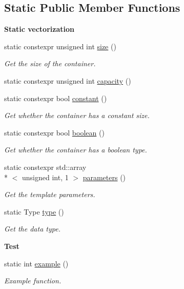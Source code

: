 \subsection*{Static Public Member Functions}
\begin{Indent}{\bf Static vectorization}\par
\begin{DoxyCompactItemize}
\item 
static constexpr unsigned int \hyperlink{exceptionmagrathea_1_1Vectorized_a69853d16152b7ac5d6b74c0a819745a0}{size} ()
\begin{DoxyCompactList}\small\item\em Get the size of the container. \end{DoxyCompactList}\item 
static constexpr unsigned int \hyperlink{exceptionmagrathea_1_1Vectorized_aa169da938d44f5b2b368429d2fcd5944}{capacity} ()
\item 
static constexpr bool \hyperlink{exceptionmagrathea_1_1Vectorized_a41efb27191ba62b4effdccb2394292f5}{constant} ()
\begin{DoxyCompactList}\small\item\em Get whether the container has a constant size. \end{DoxyCompactList}\item 
static constexpr bool \hyperlink{exceptionmagrathea_1_1Vectorized_acc636c7bf7d53ef854781fbc015e19bd}{boolean} ()
\begin{DoxyCompactList}\small\item\em Get whether the container has a boolean type. \end{DoxyCompactList}\item 
static constexpr std\-::array\\*
$<$ unsigned int, 1 $>$ \hyperlink{exceptionmagrathea_1_1Vectorized_a587bd8b091c3a477bd7e9cec7d59b5aa}{parameters} ()
\begin{DoxyCompactList}\small\item\em Get the template parameters. \end{DoxyCompactList}\item 
static Type \hyperlink{exceptionmagrathea_1_1Vectorized_a39bb3943c9d25bf2701b57b8bf9953f0}{type} ()
\begin{DoxyCompactList}\small\item\em Get the data type. \end{DoxyCompactList}\end{DoxyCompactItemize}
\end{Indent}
\begin{Indent}{\bf Test}\par
\begin{DoxyCompactItemize}
\item 
static int \hyperlink{exceptionmagrathea_1_1Vectorized_a345a5a4bc7ded7c4a9e61e5c6413bf8e}{example} ()
\begin{DoxyCompactList}\small\item\em Example function. \end{DoxyCompactList}\end{DoxyCompactItemize}
\end{Indent}
